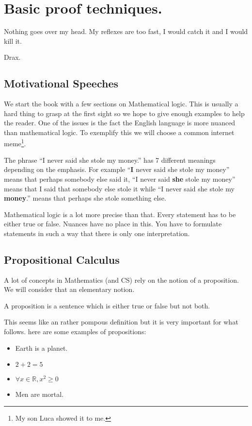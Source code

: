 \chapter{Basic proof techniques.}\label{chap:Basicproof}
\epigraph{Nothing goes over my head. My reflexes are too fast, I would catch it and I would kill it. }{ Drax.}

\section{Motivational Speeches}
We start the book with a  few sections on Mathematical logic. This is usually a hard thing to grasp at the first sight so we hope to give enough examples to help the reader.
One of the issues is the fact the English language is more nuanced than mathematical logic. To exemplify this we will choose a common   internet meme\footnote{My son Luca showed it to me.}. 

The phrase
``I never said she stole my money.'' has 7 different meanings depending on the emphasis. For example ``{\bf I } never said she stole my money'' means that perhaps somebody else said it, ``I never said {\bf she} stole my money'' means that I said that somebody else stole it  while ``I never said she stole my {\bf money}.'' means that perhaps she stole something else.

 Mathematical logic is a lot more precise than that. Every statement has to be either true or false. Nuances have no place in this. You have to formulate statements in such a way that there is only one interpretation. 

\section{Propositional Calculus}

A lot of concepts in Mathematics (and CS) rely on the notion of a proposition. We will consider that an elementary notion.

\begin{Definition}
A proposition is a sentence which is either true or false but not both.
\end{Definition}

This seems like an rather pompous definition but it is very important for what follows. here are some examples of propositions:
\begin{itemize}
\item Earth is a planet.
\item $2+2=5$
\item $\forall x \in \mathbb{R}, x^2 \ge 0$
\item Men are mortal.
\end{itemize}

